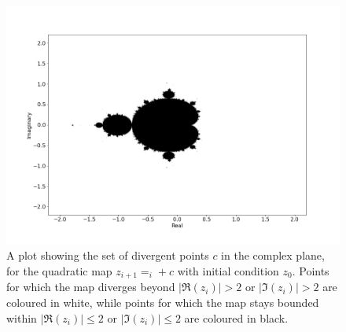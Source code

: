 \documentclass{article}
\begin{document}
\begin{figure}
    \hspace{-15mm}
    \includegraphics[scale=0.6]{quad_map_colouring_bw.png}
    \caption{A plot showing the set of divergent points $c$ in the complex plane, for the quadratic map $z_{i + 1} = _i + c$ with initial condition $z_0$. Points for which the map diverges beyond $|\mathfrak{R}(z_i)| > 2$ or $|\mathfrak{I}(z_i)| > 2$ are coloured in white, while points for which the map stays bounded within $|\mathfrak{R}(z_i)| \leq 2$ or $|\mathfrak{I}(z_i)| \leq 2$ are coloured in black.}
    \label{fig:quad_map_bw}
\end{figure}
\end{document}
